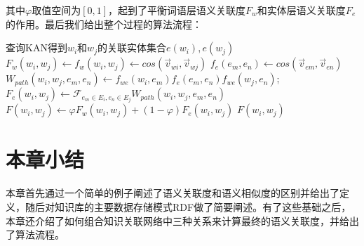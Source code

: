 \noindent 其中$\varphi$取值空间为$[0,1]$，起到了平衡词语层语义关联度$F_w$和实体层语义关联度$F_e$的作用。最后我们给出整个过程的算法流程：

\begin{algorithm}
    \label{alg:kan-sr}
    \BlankLine
    查询KAN得到$w_i$和$w_j$的关联实体集合$e(w_i), e(w_j)$ \;
    $F_w(w_i, w_j) \leftarrow f_w(w_i, w_j) \leftarrow cos(\vec v_{wi},\vec v_{wj})$ \;
     {
        $f_e(e_m, e_n) \leftarrow cos(\vec v_{em},\vec v_{en})$ \;
        $W_{path}(w_i, w_j, e_m, e_n) \leftarrow f_{we}(w_i, e_m)f_e(e_m, e_n)f_{we}(w_j, e_n)$; \;
    }
    $F_e(w_i, w_j) \leftarrow \mathscr{F}_{e_m \in E_i,e_n \in E_j}W_{path}(w_i, w_j, e_m, e_n)$ \;
    $F(w_i, w_j) \leftarrow \varphi F_w(w_i, w_j) + (1 - \varphi) F_e(w_i, w_j)$ \;
    \Return $F(w_i, w_j)$
\end{algorithm}


\section{本章小结}
本章首先通过一个简单的例子阐述了语义关联度和语义相似度的区别并给出了定义，随后对知识库的主要数据存储模式RDF做了简要阐述。有了这些基础之后，本章还介绍了如何组合知识关联网络中三种关系来计算最终的语义关联度，并给出了算法流程。

